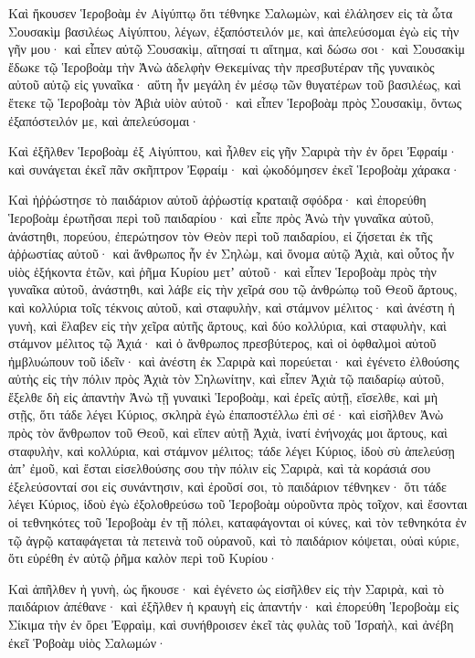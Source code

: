 {\par }{\PP {}Καὶ ἤκουσεν Ἱεροβοὰμ ἐν Αἰγύπτῳ ὅτι τέθνηκε Σαλωμὼν, καὶ ἐλάλησεν εἰς τὰ ὦτα Σουσακὶμ βασιλέως Αἰγύπτου, λέγων, ἐξαπόστειλόν με, καὶ ἀπελεύσομαι ἐγὼ εἰς τὴν γῆν μου· καὶ εἶπεν αὐτῷ Σουσακὶμ, αἴτησαί τι αἴτημα, καὶ δώσω σοι·
καὶ Σουσακὶμ ἔδωκε τῷ Ἱεροβοὰμ τὴν Ἀνὼ ἀδελφὴν Θεκεμίνας τὴν πρεσβυτέραν τῆς γυναικὸς αὐτοῦ αὐτῷ εἰς γυναῖκα· αὕτη ἦν μεγάλη ἐν μέσῳ τῶν θυγατέρων τοῦ βασιλέως, καὶ ἔτεκε τῷ Ἱεροβοὰμ τὸν Ἀβιὰ υἱὸν αὐτοῦ·
καὶ εἶπεν Ἱεροβοὰμ πρὸς Σουσακὶμ, ὄντως ἐξαπόστειλόν με, καὶ ἀπελεύσομαι·
\par }{\PP Καὶ ἐξῆλθεν Ἱεροβοὰμ ἐξ Αἰγύπτου, καὶ ἦλθεν εἰς γῆν Σαριρὰ τὴν ἐν ὄρει Ἐφραίμ· καὶ συνάγεται ἐκεῖ πᾶν σκῆπτρον Ἐφραίμ· καὶ ᾠκοδόμησεν ἐκεῖ Ἱεροβοὰμ χάρακα·
\par }{\PP {}Καὶ ἠῤῥώστησε τὸ παιδάριον αὐτοῦ ἀῤῥωστίᾳ κραταιᾷ σφόδρα· καὶ ἐπορεύθη Ἱεροβοὰμ ἐρωτῆσαι περὶ τοῦ παιδαρίου· καὶ εἶπε πρὸς Ἀνὼ τὴν γυναῖκα αὐτοῦ, ἀνάστηθι, πορεύου, ἐπερώτησον τὸν Θεὸν περὶ τοῦ παιδαρίου, εἰ ζήσεται ἐκ τῆς ἀῤῥωστίας αὐτοῦ·
καὶ ἄνθρωπος ἦν ἐν Σηλὼμ, καὶ ὄνομα αὐτῷ Ἀχιὰ, καὶ οὗτος ἦν υἱὸς ἑξήκοντα ἐτῶν, καὶ ῥῆμα Κυρίου μετʼ αὐτοῦ· καὶ εἶπεν Ἱεροβοὰμ πρὸς τὴν γυναῖκα αὐτοῦ, ἀνάστηθι, καὶ λάβε εἰς τὴν χεῖρά σου τῷ ἀνθρώπῳ τοῦ Θεοῦ ἄρτους, καὶ κολλύρια τοῖς τέκνοις αὐτοῦ, καὶ σταφυλὴν, καὶ στάμνον μέλιτος·
καὶ ἀνέστη ἡ γυνὴ, καὶ ἔλαβεν εἰς τὴν χεῖρα αὐτῆς ἄρτους, καὶ δύο κολλύρια, καὶ σταφυλὴν, καὶ στάμνον μέλιτος τῷ Ἀχιά· καὶ ὁ ἄνθρωπος πρεσβύτερος, καὶ οἱ ὀφθαλμοὶ αὐτοῦ ἠμβλυώπουν τοῦ ἰδεῖν·
καὶ ἀνέστη ἐκ Σαριρὰ καὶ πορεύεται· καὶ ἐγένετο ἐλθούσης αὐτὴς εἰς τὴν πόλιν πρὸς Ἀχιὰ τὸν Σηλωνίτην, καὶ εἶπεν Ἀχιὰ τῷ παιδαρίῳ αὐτοῦ, ἔξελθε δὴ εἰς ἀπαντὴν Ἀνὼ τῇ γυναικὶ Ἱεροβοὰμ, καὶ ἐρεῖς αὐτῇ, εἴσελθε, καὶ μὴ στῇς, ὅτι τάδε λέγει Κύριος, σκληρὰ ἐγὼ ἐπαποστέλλω ἐπὶ σέ·
καὶ εἰσῆλθεν Ἀνὼ πρὸς τὸν ἄνθρωπον τοῦ Θεοῦ, καὶ εἴπεν αὐτῇ Ἀχιὰ, ἱνατί ἐνήνοχάς μοι ἄρτους, καὶ σταφυλὴν, καὶ κολλύρια, καὶ στάμνον μέλιτος; τάδε λέγει Κύριος, ἰδοὺ σὺ ἀπελεύσῃ ἀπʼ ἐμοῦ, καὶ ἔσται εἰσελθούσης σου τὴν πόλιν εἰς Σαριρὰ, καὶ τὰ κοράσιά σου ἐξελεύσονταί σοι εἰς συνάντησιν, καὶ ἐροῦσί σοι, τὸ παιδάριον τέθνηκεν·
ὅτι τάδε λέγει Κύριος, ἰδοὺ ἐγὼ ἐξολοθρεύσω τοῦ Ἱεροβοὰμ οὐροῦντα πρὸς τοῖχον, καὶ ἔσονται οἱ τεθνηκότες τοῦ Ἱεροβοὰμ ἐν τῇ πόλει, καταφάγονται οἱ κύνες, καὶ τὸν τεθνηκότα ἐν τῷ ἀγρῷ καταφάγεται τὰ πετεινὰ τοῦ οὐρανοῦ, καὶ τὸ παιδάριον κόψεται, οὐαὶ κύριε, ὅτι εὑρέθη ἐν αὐτῷ ῥῆμα καλὸν περὶ τοῦ Κυρίου·
\par }{\PP {}Καὶ ἀπῆλθεν ἡ γυνὴ, ὡς ἤκουσε· καὶ ἐγένετο ὡς εἰσῆλθεν εἰς τὴν Σαριρὰ, καὶ τὸ παιδάριον ἀπέθανε· καὶ ἐξῆλθεν ἡ κραυγὴ εἰς ἀπαντήν· καὶ ἐπορεύθη Ἱεροβοὰμ εἰς Σίκιμα τὴν ἐν ὄρει Ἐφραὶμ, καὶ συνήθροισεν ἐκεῖ τὰς φυλὰς τοῦ Ἰσραὴλ, καὶ ἀνέβη ἐκεῖ Ῥοβοὰμ υἱὸς Σαλωμών·
}

